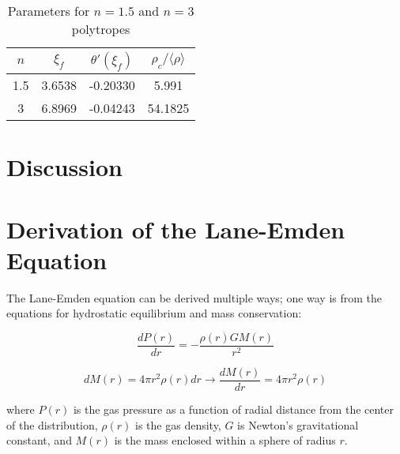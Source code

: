\documentclass[twoside]{article}
\begin{document}
\begin{multicols}{2}
\begin{table}[H]
\caption{Parameters for \(n=1.5\) and \(n=3\) polytropes\cite[p.340]{hansen2004}}
\centering
\begin{tabular}{c | c c c}
\toprule
\(n\) & \(\xi_f\) & \(\theta'(\xi_f)\) & \(\rho_c/\langle \rho \rangle\) \\
\midrule
1.5 & 3.6538 & -0.20330 & 5.991 \\
3 & 6.8969 & -0.04243 & 54.1825 \\
\bottomrule
\end{tabular}
\end{table}


\section{Discussion}

\end{multicols}



\appendix
\appendixpage
\section{Derivation of the Lane-Emden Equation\cite[pp.176--179]{leblanc2010}} 

The Lane-Emden equation can be derived multiple ways; one way is from the
equations for hydrostatic equilibrium and mass conservation:

\begin{equation}
    \label{eq:hydroeq}
    \frac{dP(r)}{dr} = -\frac{\rho(r)GM(r)}{r^2}
    \end{equation}

    \begin{equation}
    \label{eq:masscons}
    dM(r)=4\pi r^2\rho(r)dr \rightarrow \frac{dM(r)}{dr} = 4\pi r^2\rho(r)
    \end{equation}

where \(P(r)\) is the gas pressure as a function of radial distance from the
center of the distribution, \(\rho(r)\) is the gas density, \(G\) is Newton's
gravitational constant, and \(M(r)\) is the mass enclosed within a sphere of
radius \(r\).
\end{document}
